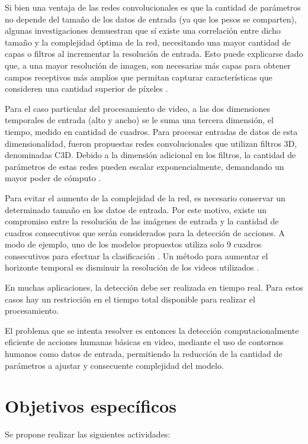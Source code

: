 \documentclass[10pt]{article}
\begin{document}
Si bien una ventaja de las redes convolucionales es que la cantidad de parámetros no depende del tamaño de los datos de entrada (ya que los pesos se comparten), algunas investigaciones demuestran que sí existe una correlación entre dicho tamaño y la complejidad óptima de la red, necesitando una mayor cantidad de  capas o filtros al incrementar la resolución de entrada. Esto puede explicarse dado que, a una mayor resolución de imagen, son necesarias más capas para obtener campos receptivos más amplios que permitan capturar características que consideren una cantidad superior de píxeles \citep{Tan2019}.

Para el caso particular del procesamiento de video, a las dos dimensiones temporales de entrada (alto y ancho) se le suma una tercera dimensión, el tiempo, medido en cantidad de cuadros. Para procesar entradas de datos de esta dimensionalidad, fueron propuestas redes convolucionales que utilizan filtros 3D, denominadas C3D. Debido a la dimensión adicional en los filtros, la cantidad de parámetros de estas redes pueden escalar exponencialmente, demandando un mayor poder de cómputo \citep{Li2019}.

Para evitar el aumento de la complejidad de la red, es necesario conservar un determinado tamaño en los datos de entrada. Por este motivo, existe un compromiso entre la resolución de las imágenes de entrada y la cantidad de cuadros consecutivos que serán considerados para la detección de acciones. A modo de ejemplo, uno de los modelos propuestos utiliza solo 9 cuadros consecutivos para efectuar la clasificación \citep{Ji2013}. Un método para aumentar el horizonte temporal es disminuir la resolución de los videos utilizados \citep{Asadi-Aghbolaghi2017}.

En muchas aplicaciones, la detección debe ser realizada en tiempo real. Para estos casos hay un restricción en el tiempo total disponible para realizar el procesamiento. 

El problema que se intenta resolver es entonces la detección computacionalmente eficiente de acciones humanas básicas en video, mediante el uso de contornos humanos como datos de entrada, permitiendo la reducción de la cantidad de parámetros a ajustar y consecuente complejidad del modelo.

\section{Objetivos específicos}

Se propone realizar las siguientes actividades: 
\end{document}
